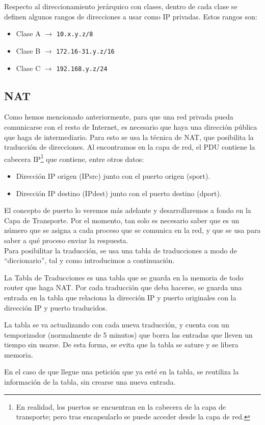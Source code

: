 Respecto al direccionamiento jerárquico con clases, dentro de cada clase se definen algunos rangos de direcciones a usar como IP privadas. Estos rangos son:
\begin{itemize}
    \item Clase A $\rightarrow$ \verb|10.x.y.z/8|
    \item Clase B $\rightarrow$ \verb|172.16-31.y.z/16|
    \item Clase C $\rightarrow$ \verb|192.168.y.z/24|
\end{itemize}



\subsection{\acrfull{NAT}}

Como hemos mencionado anteriormente, para que una red privada pueda comunicarse con el resto de Internet, es necesario que haya una dirección pública que haga de intermediario. Para esto se usa la técnica de \acrshort{NAT}, que posibilita la traducción de direcciones.
Al encontramos en la capa de red, el \acrshort{PDU} contiene la cabecera IP\footnote{En realidad, los puertos se encuentran en la cabecera de la capa de transporte; pero tras encapsularlo se puede acceder desde la capa de red.} que contiene, entre otros datos:
\begin{itemize}
    \item Dirección IP origen ({IPsrc}) junto con el puerto origen ({sport}).
    \item Dirección IP destino ({IPdest}) junto con el puerto destino ({dport}).
\end{itemize}

El concepto de puerto lo veremos más adelante y desarrollaremos a fondo en la Capa de Transporte. Por el momento, tan solo es necesario saber que es un número que se asigna a cada proceso que se comunica en la red, y que se usa para saber a qué proceso enviar la respuesta.\\

Para posibilitar la traducción, se usa una tabla de traducciones a modo de ``diccionario'', tal y como introducimos a continuación.
\begin{definicion}
    La Tabla de Traducciones es una tabla que se guarda en la memoria de todo router que haga \acrshort{NAT}.
    Por cada traducción que deba hacerse, se guarda una entrada en la tabla que relaciona la dirección IP y puerto originales con la dirección IP y puerto traducidos.

    La tabla se va actualizando con cada nueva traducción, y cuenta con un temporizador (normalmente de 5 minutos) que borra las entradas que lleven un tiempo sin usarse. De esta forma, se evita que la tabla se sature y se libera memoria.

    En el caso de que llegue una petición que ya esté en la tabla, se reutiliza la información de la tabla, sin crearse una nueva entrada.
\end{definicion}

